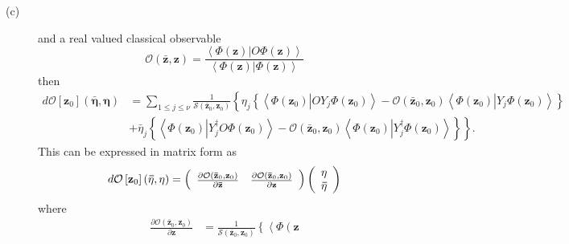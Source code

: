 \documentclass[aps,preprint]{revtex4}%
\begin{document}
\begin{description}
\item[(c)] and a real valued classical observable
\begin{equation}
\mathcal{O}\left(  \mathbf{\bar{z},z}\right)  =\frac{\left\langle \left.
\Phi\left(  \mathbf{z}\right)  \right\vert O\Phi\left(  \mathbf{z}\right)
\right\rangle }{\left\langle \left.  \Phi\left(  \mathbf{z}\right)
\right\vert \Phi\left(  \mathbf{z}\right)  \right\rangle }%
\end{equation}
then
\begin{align}
d\mathcal{O}\left[  \mathbf{z}_{0}\right]  \left(  \mathbf{\bar{\eta},\eta
}\right)   &  =\sum_{1\leq j\leq\nu}\frac{1}{\mathcal{S}\left(  \mathbf{\bar
{z}}_{0},\mathbf{z}_{0}\right)  }\left\{  \overset{}{}\eta_{j}\left\{
\left\langle \Phi\left(  \mathbf{z}_{0}\right)  \left\vert OY_{j}\Phi\left(
\mathbf{z}_{0}\right)  \right.  \right\rangle -\mathcal{O}\left(
\mathbf{\bar{z}}_{0},\mathbf{z}_{0}\right)  \left\langle \Phi\left(
\mathbf{z}_{0}\right)  \left\vert Y_{j}\Phi\left(  \mathbf{z}_{0}\right)
\right.  \right\rangle \right\}  \right. \nonumber\\
&  +\left.  \bar{\eta}_{j}\left\{  \left\langle \Phi\left(  \mathbf{z}%
_{0}\right)  \left\vert Y_{j}^{\dagger}O\Phi\left(  \mathbf{z}_{0}\right)
\right.  \right\rangle -\mathcal{O}\left(  \mathbf{\bar{z}}_{0},\mathbf{z}%
_{0}\right)  \left\langle \Phi\left(  \mathbf{z}_{0}\right)  \left\vert
Y_{j}^{\dagger}\Phi\left(  \mathbf{z}_{0}\right)  \right.  \right\rangle
\right\}  \overset{}{}\right\}  .
\end{align}
This can be expressed in matrix form as
\begin{equation}
d\mathcal{O}\left[  \mathbf{z}_{0}\right]  \left(  \mathbf{\bar{\eta},\eta
}\right)  =\left(
\begin{array}
[c]{cc}%
\frac{\partial\mathcal{O}\left(  \mathbf{\bar{z}}_{0},\mathbf{z}_{0}\right)
}{\partial\mathbf{\bar{z}}} & \frac{\partial\mathcal{O}\left(  \mathbf{\bar
{z}}_{0},\mathbf{z}_{0}\right)  }{\partial\mathbf{z}}%
\end{array}
\right)  \left(
\begin{array}
[c]{c}%
\mathbf{\eta}\\
\mathbf{\bar{\eta}}%
\end{array}
\right)
\end{equation}
where
\begin{align}
\frac{\partial\mathcal{O}\left(  \mathbf{\bar{z}}_{0},\mathbf{z}_{0}\right)
}{\partial\mathbf{z}}  &  =\frac{1}{\mathcal{S}\left(  \mathbf{\bar{z}}%
_{0},\mathbf{z}_{0}\right)  }\left\{  \left\langle \Phi\left(  \mathbf{z}%

\end{align}
\end{description}
\end{document}
